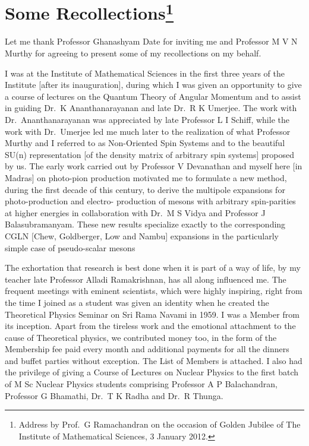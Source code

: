 \chapter[Some Recollection]{Some Recollections\footnote[*]{Address by Prof.\ G Ramachandran on the occasion of Golden Jubilee of The Institute of Mathematical Sciences, 3 January 2012.}}\label{chap2}

\medskip

Let me thank Professor Ghanashyam Date for inviting me and Professor M V N Murthy
for agreeing to present some of my recollections on my behalf.

I was at the Institute of Mathematical Sciences in the first three years of the
Institute [after its inauguration], during which I was given an opportunity to give
a course of lectures on the Quantum Theory of Angular Momentum and to assist
in guiding Dr.\ K Ananthanarayanan and late Dr.\ R K Umerjee. The work with Dr.\ 
Ananthanarayanan was appreciated by late Professor L I Schiff, while the work with
Dr.\ Umerjee led me much later to the realization of what Professor Murthy and I
referred to as Non-Oriented Spin Systems and to the beautiful SU(n) representation
[of the density matrix of arbitrary spin systems] proposed by us. The early work
carried out by Professor V Devanathan and myself here [in Madras] on photo-pion
production motivated me to formulate a new method, during the first decade of
this century, to derive the multipole expansions for photo-production and electro-
production of mesons with arbitrary spin-parities at higher energies in collaboration
with Dr.\ M S Vidya and Professor J Balasubramanyam. These new results specialize
exactly to the corresponding CGLN [Chew, Goldberger, Low and Nambu] expansions
in the particularly simple case of pseudo-scalar mesons

The exhortation that research is best done when it is part of a way of life, by
my teacher late Professor Alladi Ramakrishnan, has all along influenced me. The
frequent meetings with eminent scientists, which were highly inspiring, right from
the time I joined as a student was given an identity when he created the Theoretical
Physics Seminar on Sri Rama Navami in 1959. I was a Member from its inception.
Apart from the tireless work and the emotional attachment to the cause of\break 
Theoretical physics, we contributed money too, in the form of the Membership fee paid every
month and additional payments for all the dinners and buffet parties without exception. 
The List of Members is attached. I also had the privilege of giving a Course
of Lectures on Nuclear Physics to the first batch of M Sc Nuclear Physics students
comprising Professor A P Balachandran, Professor G Bhamathi, Dr.\ T K Radha and
Dr.\ R Thunga.

